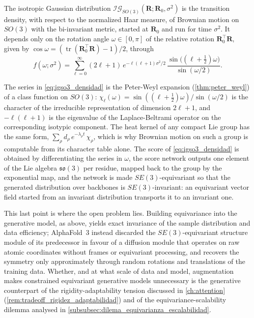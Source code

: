 \begin{definition}\label{def:igso3}
The isotropic Gaussian distribution $\mathcal{IG}_{SO(3)}(\mathbf{R}; \mathbf{R}_0, \sigma^2)$ is the transition density, with respect to the normalized Haar measure, of Brownian motion on $SO(3)$ with the bi-invariant metric, started at $\mathbf{R}_0$ and run for time $\sigma^2$. It depends only on the rotation angle $\omega \in [0, \pi]$ of the relative rotation $\mathbf{R}_0^\top \mathbf{R}$, given by $\cos\omega = (\operatorname{tr}(\mathbf{R}_0^\top \mathbf{R}) - 1)/2$, through
\begin{equation}\label{eq:igso3_densidad}
    f(\omega; \sigma^2) = \sum_{\ell = 0}^{\infty} (2\ell + 1)\, e^{-\ell(\ell+1)\sigma^2/2}\, \frac{\sin\big((\ell + \tfrac{1}{2})\omega\big)}{\sin(\omega/2)}.
\end{equation}
\end{definition}

The series in \eqref{eq:igso3_densidad} is the Peter-Weyl expansion (\autoref{thm:peter_weyl}) of a class function on $SO(3)$: $\chi_\ell(\omega) = \sin((\ell + \tfrac{1}{2})\omega)/\sin(\omega/2)$ is the character of the irreducible representation of dimension $2\ell + 1$, and $-\ell(\ell+1)$ is the eigenvalue of the Laplace-Beltrami operator on the corresponding isotypic component. The heat kernel of any compact Lie group has the same form, $\sum_\rho d_\rho\, e^{-\lambda_\rho t}\, \chi_\rho$, which is why Brownian motion on such a group is computable from its character table alone. The score of \eqref{eq:igso3_densidad} is obtained by differentiating the series in $\omega$, the score network outputs one element of the Lie algebra $\mathfrak{so}(3)$ per residue, mapped back to the group by the exponential map, and the network is made $SE(3)$-equivariant so that the generated distribution over backbones is $SE(3)$-invariant: an equivariant vector field started from an invariant distribution transports it to an invariant one.

This last point is where the open problem lies. Building equivariance into the generative model, as above, yields exact invariance of the sample distribution and data efficiency; AlphaFold~3 \citep{abramson2024alphafold3} instead discarded the $SE(3)$-equivariant structure module of its predecessor in favour of a diffusion module that operates on raw atomic coordinates without frames or equivariant processing, and recovers the symmetry only approximately through random rotations and translations of the training data. Whether, and at what scale of data and model, augmentation makes constrained equivariant generative models unnecessary is the generative counterpart of the rigidity-adaptability tension discussed in \autoref{ch:attention} (\autoref{rem:tradeoff_rigidez_adaptabilidad}) and of the equivariance-scalability dilemma analysed in \autoref{subsubsec:dilema_equivarianza_escalabilidad}.


